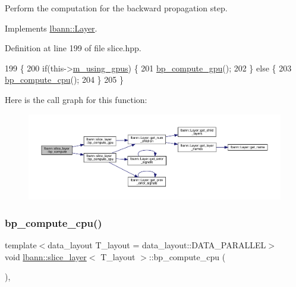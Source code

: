 Perform the computation for the backward propagation step. 

Implements \hyperlink{classlbann_1_1Layer_a7442e01f9ee1294df2de811efcf5171e}{lbann\+::\+Layer}.



Definition at line 199 of file slice.\+hpp.


\begin{DoxyCode}
199                              \{
200     \textcolor{keywordflow}{if}(this->\hyperlink{classlbann_1_1Layer_af7881cb5eff5207c15fa835d65462e8f}{m\_using\_gpus}) \{
201       \hyperlink{classlbann_1_1slice__layer_a798c10e5c19f58e38da9d2d50c49ca3e}{bp\_compute\_gpu}();
202     \} \textcolor{keywordflow}{else} \{
203       \hyperlink{classlbann_1_1slice__layer_af5d6887cac9a0c3afab8f361cdf81034}{bp\_compute\_cpu}();
204     \}
205   \}
\end{DoxyCode}
Here is the call graph for this function\+:\nopagebreak
\begin{figure}[H]
\begin{center}
\leavevmode
\includegraphics[width=350pt]{classlbann_1_1slice__layer_a080654076a1b266b2c6d229e9fccf250_cgraph}
\end{center}
\end{figure}
\mbox{\label{classlbann_1_1slice__layer_af5d6887cac9a0c3afab8f361cdf81034}} 
\subsubsection{\texorpdfstring{bp\+\_\+compute\+\_\+cpu()}{bp\_compute\_cpu()}}
{\footnotesize\ttfamily template$<$data\+\_\+layout T\+\_\+layout = data\+\_\+layout\+::\+D\+A\+T\+A\+\_\+\+P\+A\+R\+A\+L\+L\+EL$>$ \\
void \hyperlink{classlbann_1_1slice__layer}{lbann\+::slice\+\_\+layer}$<$ T\+\_\+layout $>$\+::bp\+\_\+compute\+\_\+cpu (\begin{DoxyParamCaption}{ }\end{DoxyParamCaption})\hspace{0.3cm}{\ttfamily [inline]}, {\ttfamily [protected]}}



